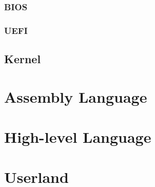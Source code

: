 \documentclass[pdftex,10pt]{article}
\begin{document}
\subsubsection{BIOS}
\subsubsection{UEFI}

\subsection{Kernel}

\section{Assembly Language}

\section{High-level Language}

\section{Userland}
\end{document}
